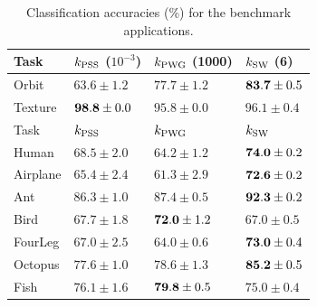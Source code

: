 \begin{table}[t]
\vskip 0.15in
\begin{center}
\begin{small}
\begin{sc}

\begin{tabular}{|l|lll|}
\hline 
Task &         $k_{\rm PSS}$ ($10^{-3}$)&    $k_{\rm PWG}$ (1000) &                   $k_{\rm SW}$ (6)                                  \\
\hline 
Orbit &        $63.6\pm1.2$ &          $77.7\pm1.2$ &                     ${\bf 83.7}\pm0.5$                           \\        
Texture &      ${\bf 98.8}\pm 0.0$ &   $95.8\pm0.0$ &                     $96.1\pm0.4$                          \\                                           
\hline 
Task &         $k_{\rm PSS}$ &               $k_{\rm PWG}$ &                          $k_{\rm SW}$                           \\
\hline 
Human &        $68.5\pm2.0$ &          $64.2\pm1.2$ &                     ${\bf 74.0}\pm0.2 $ \\
Airplane &     $65.4\pm2.4$ &          $61.3\pm2.9$ &                     ${\bf 72.6}\pm0.2$  \\
Ant &          $86.3\pm1.0$ &          $87.4\pm0.5$ &                     ${\bf 92.3}\pm0.2$  \\
Bird &         $67.7\pm1.8$ &          ${\bf72.0}\pm1.2$ &                $67.0\pm0.5$  \\
FourLeg &      $67.0\pm2.5$ &          $64.0\pm0.6$ &                     ${\bf73.0}\pm0.4$ \\
Octopus &      $77.6\pm1.0$ &          $78.6\pm1.3$ &                     ${\bf85.2}\pm0.5$  \\
Fish &         $76.1\pm1.6$ &          ${\bf79.8}\pm0.5$ &                $75.0\pm0.4$ \\
\hline                                                            
\end{tabular}
\end{sc}
\end{small}

\caption{\label{table:Acc} Classification accuracies (\%) for the benchmark applications.}
\end{center}
\vskip -0.1in
\end{table}

